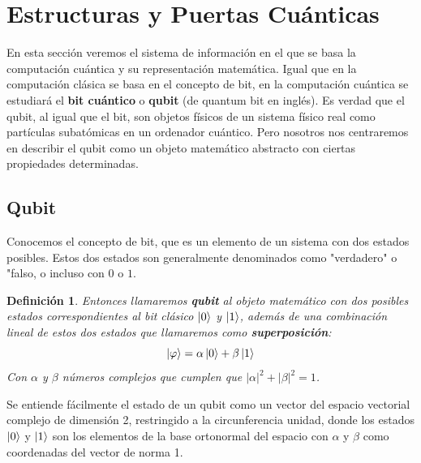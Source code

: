 \documentclass[a4paper]{article}
\newtheorem{deff}{Definición}[section]
\numberwithin{equation}{section}
\begin{document}



\newpage

\section{Estructuras y Puertas Cuánticas}

En esta sección veremos el sistema de información en el que se basa la computación cuántica y su representación matemática. Igual que en la computación clásica se basa en el concepto de bit, en la computación cuántica se estudiará el \textbf{bit cuántico} o \textbf{qubit} (de quantum bit en inglés). Es verdad que el qubit, al igual que el bit, son objetos físicos de un sistema físico real como partículas subatómicas en un ordenador cuántico. Pero nosotros nos centraremos en describir el qubit como un objeto matemático abstracto con ciertas propiedades determinadas.


\subsection{Qubit}

Conocemos el concepto de bit, que es un elemento de un sistema con dos estados posibles. Estos dos estados son generalmente denominados como "verdadero" o "falso, o incluso con $0$ o $1$.
\begin{deff}Entonces llamaremos \textbf{qubit} al objeto matemático con dos posibles estados correspondientes al bit clásico $\ket{0}$ y $\ket{1}$, además de una combinación lineal de estos dos estados que llamaremos como \textbf{superposición}:
\begin{equation}
\ket{\varphi} = \alpha\ket{0} + \beta\ket{1}
\end{equation}
Con $\alpha$ y $\beta$ números complejos que cumplen que $|\alpha|^2 + |\beta|^2 = 1$.
\end{deff}
Se entiende fácilmente el estado de un qubit como un vector del espacio vectorial complejo de dimensión 2, restringido a la circunferencia unidad, donde los estados $\ket{0}$ y $\ket{1}$ son los elementos de la base ortonormal del espacio con $\alpha$ y $\beta$ como coordenadas del vector de norma 1.
\end{document}
